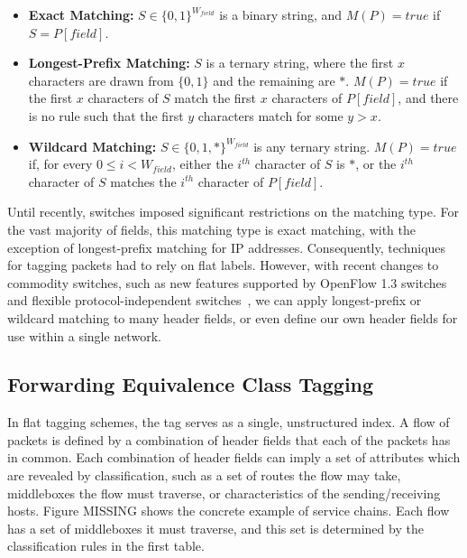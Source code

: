 \begin{itemize}
  \item \textbf{Exact Matching:} $S \in \{0,1\}^{W_{field}}$ is a binary string, and $M(P) = true$ if $S = P[field]$.\\
  \item \textbf{Longest-Prefix Matching:} $S$ is a ternary string, where the first $x$ characters are drawn from $\{0,1\}$ and the remaining are $*$. $M(P) = true$ if the first $x$ characters of $S$ match the first $x$ characters of $P[field]$, and there is no rule such that the first $y$ characters match for some $y > x$.\\
  \item \textbf{Wildcard Matching:} $S \in \{0,1,*\}^{W_{field}}$ is any ternary string. $M(P) = true$ if, for every $0 \le i < W_{field}$, either the $i^{th}$ character of $S$ is $*$, or the $i^{th}$ character of $S$ matches the $i^{th}$ character of $P[field]$. 
\end{itemize}
  
Until recently, switches imposed significant restrictions on the matching type.  For the vast majority of fields, this matching type is exact matching, with the exception of longest-prefix matching for IP addresses. Consequently, techniques for tagging packets had to rely on flat labels.  However, with recent changes to commodity switches, such as new features supported by OpenFlow 1.3 switches~\cite{of13} and flexible protocol-independent switches~\cite{P4}, we can apply longest-prefix or wildcard matching to many header fields, or even define our own header fields for use within a single network.

\subsection{Forwarding Equivalence Class Tagging}
In flat tagging schemes, the tag serves as a single, unstructured index.  A flow of packets is defined by a combination of header fields that each of the packets has in common. Each combination of header fields can imply a set of attributes which are revealed by classification, such as a set of routes the flow may take, middleboxes the flow must traverse, or characteristics  of the sending/receiving hosts.  Figure MISSING shows the concrete example of service chains. Each flow has a set of middleboxes it must traverse, and this set is determined by the classification rules in the first table.

